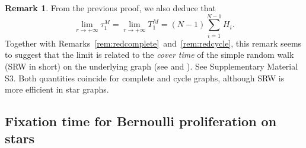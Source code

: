 \documentclass[a4paper,english,10pt]{amsart}
\theoremstyle{definition}
\newtheorem{remark}{Remark}
\numberwithin{equation}{section}
\begin{document}
\begin{remark} \label{rem:redstar}
From the previous proof, we also deduce that 
$$\lim_{r \to +\infty} \tau_1^M = \lim_{r \to +\infty} T_1^M = 
 (N-1) \sum_{i=1}^{N-1} H_ i.$$
Together with Remarks~\ref{rem:redcomplete}~and~\ref{rem:redcycle}, this remark seems to suggest that the limit is related to the \emph{cover time} of the simple random walk (SRW in short) on the underlying graph (see \cite{Lovasz1993} and \cite{LevinPeres}). See Supplementary Material S3.
Both quantities coincide for complete and cycle graphs, although SRW is more efficient in star graphs.
\end{remark}

\subsection{Fixation time for Bernoulli proliferation on stars}
\end{document}
